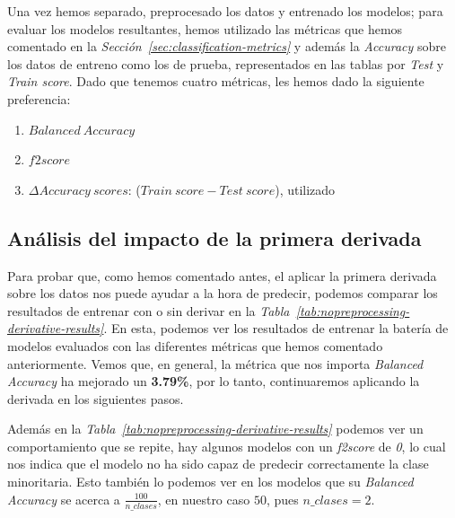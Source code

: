 Una vez hemos separado, preprocesado los datos y entrenado los modelos; para evaluar los modelos resultantes, hemos utilizado las métricas que hemos comentado en la \textit{Sección\ \ref*{sec:classification-metrics}} y además la \textit{Accuracy} sobre los datos de entreno como los de prueba, representados en las tablas por \textit{Test} y \textit{Train score}.
Dado que tenemos cuatro métricas, les hemos dado la siguiente preferencia:
\begin{enumerate}
    \item $Balanced\ Accuracy$
    \item $f2score$
    \item $\Delta Accuracy\ scores$: ($Train\ score-Test\ score$), utilizado 
\end{enumerate}


\subsection{Análisis del impacto de la primera derivada}

Para probar que, como hemos comentado antes, el aplicar la primera derivada sobre los datos nos puede ayudar a la hora de predecir, podemos comparar los resultados de entrenar con o sin derivar en la \textit{Tabla\ \ref{tab:nopreprocessing-derivative-results}}. En esta, podemos ver los resultados de entrenar la batería de modelos evaluados con las diferentes métricas que hemos comentado anteriormente. Vemos que, en general, la métrica que nos importa \textit{Balanced Accuracy} ha mejorado un \textbf{3.79\%}, por lo tanto, continuaremos aplicando la derivada en los siguientes pasos.

Además en la \textit{Tabla\ \ref{tab:nopreprocessing-derivative-results}} podemos ver un comportamiento que se repite, hay algunos modelos con un \textit{f2score} de \textit{0}, lo cual nos indica que el modelo no ha sido capaz de predecir correctamente la clase minoritaria. Esto también lo podemos ver en los modelos que su \textit{Balanced Accuracy} se acerca a $\frac{100}{n\_clases}$, en nuestro caso $50$, pues $n\_clases=2$.


